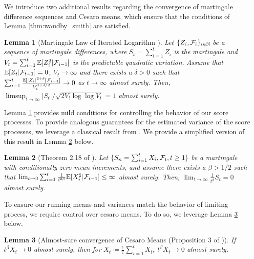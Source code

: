 \documentclass{article}
\newtheorem{lemma}{Lemma}
\begin{document}
\begin{appendices}
We introduce two additional results regarding the convergence of martingale difference sequences and Cesaro means, which ensure that the conditions of Lemma \ref{thm:waudby_smith} are satisfied. 

\begin{lemma}[Martingale Law of Iterated Logarithm \citep{stout1974almost}]\label{lem:stout_lil}
        Let $\{Z_i, \mathcal{F}_i\}_{i\in \mathbb{N}}$ be a sequence of martingale differences, where $S_t = \sum_{i=1}^t Z_i$ is the martingale and $V_t = \sum_{i=1}^t\mathbb{E}[Z_i^2|\mathcal{F}_{i-1}]$ is the predictable quadratic variation. Assume that $\mathbb{E}[Z_t|\mathcal{F}_{t-1}]= 0$, $V_t \rightarrow \infty$ and there exists a $\delta>0$ such that $\sum_{i=1}^t \frac{\mathbb{E}[|Z_i|^{2+\delta}|\mathcal{F}_{i-1}]}{V_t^{1+\delta/2}} \rightarrow 0$ as $t \rightarrow \infty$ almost surely. Then, $\limsup_{t \rightarrow \infty} |S_t|/\sqrt{2V_t\log\log V_t} = 1$ almost surely. 
\end{lemma}

Lemma \ref{lem:stout_lil} provides mild conditions for controlling the behavior of our score processes. To provide analogous guarantees for the estimated variance of the score processes, we leverage a classical result from \cite{hall2014martingale}. We provide a simplified version of this result in Lemma \ref{lem:hall_martingale} below. 

\begin{lemma}[Theorem 2.18 of \cite{hall2014martingale}]\label{lem:hall_martingale}
Let $\{S_n = \sum_{i=1}^t X_i, \mathcal{F}_t, t\geq  1\}$ be a martingale with conditionally zero-mean increments, and assume there exists a $\beta > 1/2$ such that $\lim_{t \rightarrow 0}\sum_{i=1}^t \frac{1}{i^{2\beta}} \mathbb{E}[X_i^2|\mathcal{F}_{i-1}] \leq \infty$ almost surely. Then, $\lim_{t \rightarrow \infty} \frac{1}{t^{\beta}} S_t =0$ almost surely. 
\end{lemma}

To ensure our running means and variances match the behavior of limiting process, we require control over cesaro means. To do so, we leverage Lemma \ref{lem:cesaro_convergence} below. 


\begin{lemma}[Almost-sure convergence of Cesaro Means (Proposition 3 of \cite{bibaut2020sufficientinsufficientconditionsstochastic})]\label{lem:cesaro_convergence}
    If $t^\beta X_t \rightarrow 0$ almost surely, then for $\bar{X}_t  \coloneqq \frac{1}{t}\sum_{i=1}^t X_i$, $t^\beta\bar{X}_t \rightarrow 0$ almost surely. 
\end{lemma}




\end{appendices}
\end{document}
